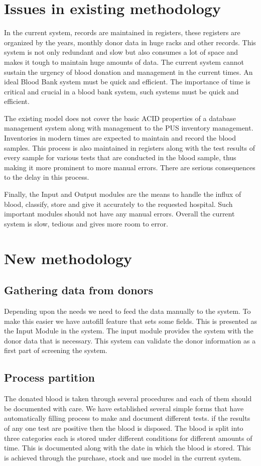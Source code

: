\documentclass[BTech]{srmuthesis}
\begin{document}
\section{Issues in existing methodology}
In the current system, records are maintained in registers, these registers are organized by the years, monthly donor data in huge racks and other records. This system is not only redundant and slow but also consumes a lot of space and makes it tough to maintain huge amounts of data. The current system cannot sustain the urgency of blood donation and management in the current times. An ideal Blood Bank system must be quick and efficient. The importance of time is critical and crucial in a blood bank system, such systems must be quick and efficient.\par 
The existing model does not cover the basic \ac{ACID} properties of a database management system along with management to the \ac{PUS} inventory management. Inventories in modern times are expected to maintain and record the blood samples. This process is also maintained in registers along with the test results of every sample for various tests that are conducted in the blood sample, thus making it more prominent to more manual errors. There are serious consequences to the delay in this process.\par
Finally, the Input and Output modules are the means to handle the influx of blood, classify, store and give it accurately to the requested hospital. Such important modules should not have any manual errors. Overall the current system is slow, tedious and gives more room to error.
\section{New methodology}
\subsection{Gathering data from donors}
Depending upon the needs we need to feed the data manually to the system. To make this easier we have autofill feature that sets some fields. This is presented as the Input Module in the system. The input module provides the system with the donor data that is necessary. This system can validate the donor information as a first part of screening the system.
\subsection{Process partition}
The donated blood is taken through several procedures and each of them should be documented with care. We have established several simple forms that have automatically filling process to make and document different tests. if the results of any one test are positive then the blood is disposed. The blood is split into three categories each is stored under different conditions for different amounts of time. This is documented along with the date in which the blood is stored. This is achieved through the purchase, stock and use model in the current system.
\end{document}
